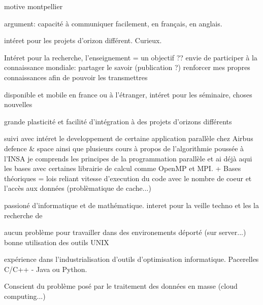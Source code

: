 motive montpellier

argument:
capacité à communiquer facilement, en français, en anglais.

intéret pour les projets d'orizon différent. Curieux.

Intéret pour la recherche, l'enseignement = un objectif ?? envie de participer à la connaissance mondiale: partager le savoir (publication ?) renforcer mes propres connaissances afin de pouvoir les transmettres

disponible et mobile en france ou à l'étranger, intéret pour les séminaire, choses nouvelles

grande plasticité et facilité d'intégration à des projets d'orizons différents

suivi avec intéret le developpement de certaine application parallèle chez Airbus defence & space
ainsi que plusieurs cours à propos de l'algorithmie poussée à l'INSA
je comprends les principes de la programmation parallèle et ai déjà aqui les bases avec certaines librairie de calcul comme OpenMP et MPI. + Bases théoriques = lois reliant vitesse d'execution du code avec le nombre de coeur et l'accès aux données (problèmatique de cache...)

passioné d'informatique et de mathématique. interet pour la veille techno et les la recherche de

aucun problème pour travailler dans des environements déporté (sur server...) bonne utilisation des outils UNIX

expérience dans l'industrialisation d'outils d'optimisation informatique. Pacerelles C/C++ - Java ou Python.

Conscient du problème posé par le traitement des données en masse (cloud computing...)
